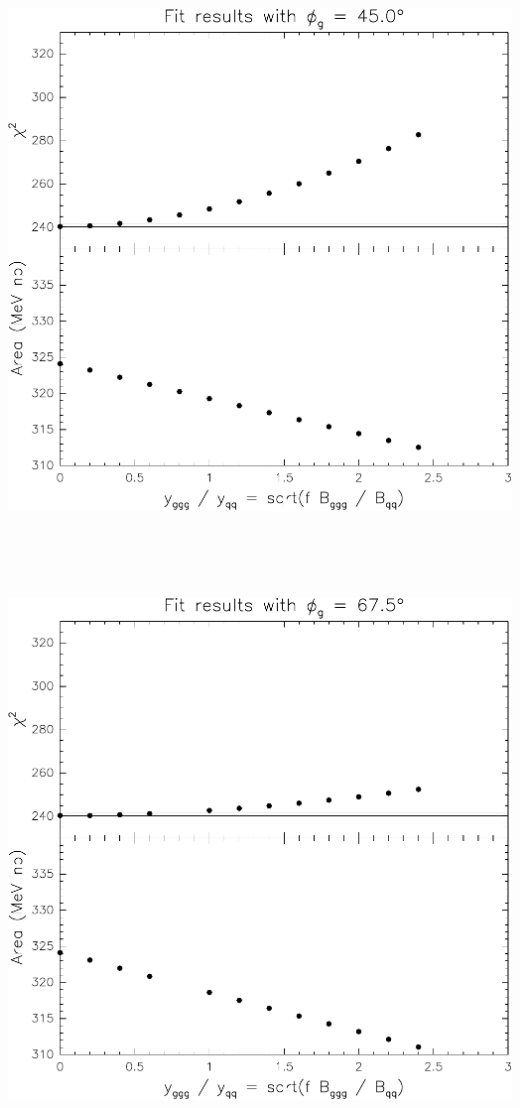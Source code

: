 \documentclass[12pt]{article}
\begin{document}
\vfill

\mbox{ }

\pagebreak

\mbox{ }

\vfill

\includegraphics[width=\linewidth]{interference-c}

\vfill

\mbox{ }

\pagebreak

\mbox{ }

\vfill

\includegraphics[width=\linewidth]{interference-d}
\end{document}
